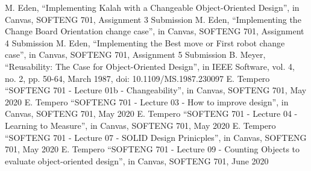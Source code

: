 \documentclass[10pt, a4paper, conference]{IEEEtran}
\begin{document}
\begin{thebibliography}{00}
   M. Eden, ``Implementing Kalah with a Changeable
    Object-Oriented Design'', in Canvas, SOFTENG 701, Assignment 3 
    Submission
   M. Eden, ``Implementing the Change Board Orientation
    change case'', in Canvas, SOFTENG 701, Assignment 4 Submission
   M. Eden, ``Implementing the Best move or First robot
    change case'', in Canvas, SOFTENG 701, Assignment 5 Submission
   B. Meyer, ``Reusability: The Case for Object-Oriented
    Design'', in IEEE Software, vol. 4, no. 2, pp. 50-64, March 1987, 
    doi: 10.1109/MS.1987.230097
   E. Tempero ``SOFTENG 701 - Lecture 01b - Changeability'',  in Canvas, SOFTENG 701, May 2020
   E. Tempero ``SOFTENG 701 - Lecture 03 - How to improve design'',  in Canvas, SOFTENG 701, May 2020
   E. Tempero ``SOFTENG 701 - Lecture 04 - Learning to Measure'',  in Canvas, SOFTENG 701, May 2020
   E. Tempero ``SOFTENG 701 - Lecture 07 - SOLID Design Prinicples'',  in Canvas, SOFTENG 701, May 2020
   E. Tempero ``SOFTENG 701 - Lecture 09 - Counting Objects to evaluate object-oriented design'',  in Canvas, SOFTENG 701, June 2020
\end{thebibliography}
\end{document}
